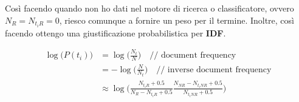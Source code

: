 \noindent Così facendo quando non ho dati nel motore di ricerca o classificatore, ovvero $N_R = N_{t_iR} = 0 $, riesco comunque a fornire un peso per il termine. 
Inoltre, così facendo ottengo una giustificazione probabilistica per \textbf{IDF}.

\begin{align*}
\log\big(P(t_i)\big) &= \log\big(\frac{N_t}{N}\big) \quad\text{// document frequency}\\
	&= - \log\big( \frac{N}{N_t}\big) \quad\text{// inverse document frequency}  \\ 
	&\approx \log\bigg( \frac{N_{t_iR} + 0.5}{N_R - N_{t_iR} + 0.5} \frac{N_{NR} - N_{t_iNR}+ 0.5}{N_{t_iNR}+ 0.5} \bigg) 
\end{align*}















